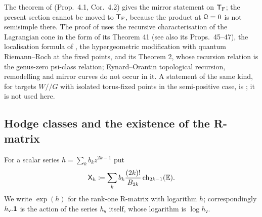 \begin{rmk}
\label{rmk:gen-mirror}
The theorem of \cite{Coa09} (Prop.~4.1, Cor.~4.2) gives the mirror statement on $\mathsf{T}_{\mathrm{F}}$; the present section cannot be moved to $\mathsf{T}_{\mathrm{F}}$, because the product at $\mathcal{Q}=0$ is not semisimple there. The proof of \cite[Theorem 31]{CCIT15} uses the recursive characterisation of the Lagrangian cone in the form of its Theorem 41 (see also its Props.~45--47), the localisation formula of \cite{Liu13}, the hypergeometric modification with quantum Riemann--Roch at the fixed points, and its Theorem 2, whose recursion relation is the genus-zero psi-class relation; Eynard--Orantin topological recursion, remodelling and mirror curves do not occur in it. A statement of the same kind, for targets $W/\!/G$ with isolated torus-fixed points in the semi-positive case, is \cite[Theorem 1.2.2, Cors.~1.4.1, 1.4.2]{CFK}; it is not used here.
\end{rmk}

\subsection{Hodge classes and the existence of the R-matrix}

For a scalar series $h=\sum_kb_kz^{2k-1}$ put
\[
\mathsf{X}_h\coloneqq\sum_kb_k\frac{(2k)!}{B_{2k}}\,\mathrm{ch}_{2k-1}(\mathbb{E}).
\]
We write $\exp(h)$ for the rank-one R-matrix with logarithm $h$; correspondingly $h_{\mathsf{v}}.\mathbf{1}$ is the action of the series $h_{\mathsf{v}}$ itself, whose logarithm is $\log h_{\mathsf{v}}$.

